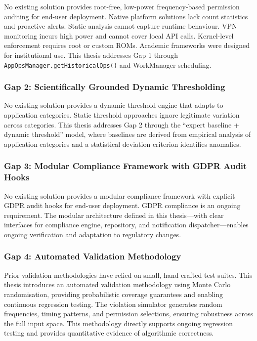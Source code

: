 No existing solution provides root-free, low-power frequency-based permission auditing for end-user deployment. Native platform solutions lack count statistics and proactive alerts. Static analysis cannot capture runtime behaviour. VPN monitoring incurs high power and cannot cover local API calls. Kernel-level enforcement requires root or custom ROMs. Academic frameworks were designed for institutional use. This thesis addresses Gap 1 through \texttt{AppOpsManager.getHistoricalOps()} and WorkManager scheduling.

\subsubsection{Gap 2: Scientifically Grounded Dynamic Thresholding}

No existing solution provides a dynamic threshold engine that adapts to application categories. Static threshold approaches ignore legitimate variation across categories. This thesis addresses Gap 2 through the ``expert baseline + dynamic threshold'' model, where baselines are derived from empirical analysis of application categories and a statistical deviation criterion identifies anomalies.

\subsubsection{Gap 3: Modular Compliance Framework with GDPR Audit Hooks}

No existing solution provides a modular compliance framework with explicit GDPR audit hooks for end-user deployment. GDPR compliance is an ongoing requirement. The modular architecture defined in this thesis—with clear interfaces for compliance engine, repository, and notification dispatcher—enables ongoing verification and adaptation to regulatory changes.

\subsubsection{Gap 4: Automated Validation Methodology}

Prior validation methodologies have relied on small, hand-crafted test suites. This thesis introduces an automated validation methodology using Monte Carlo randomisation, providing probabilistic coverage guarantees and enabling continuous regression testing. The violation simulator generates random frequencies, timing patterns, and permission selections, ensuring robustness across the full input space. This methodology directly supports ongoing regression testing and provides quantitative evidence of algorithmic correctness.

